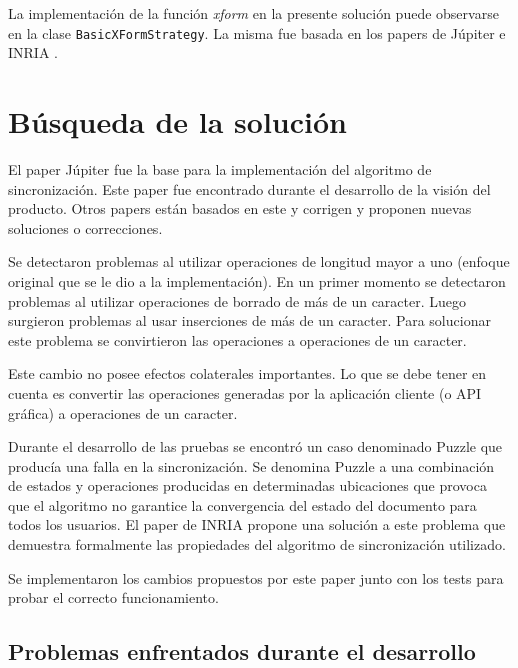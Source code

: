 \documentclass[12pt,a4paper]{article}
\begin{document}
La implementación de la función \textit{xform} en la presente solución puede observarse en la clase 
\texttt{BasicXFormStrategy}. La misma fue basada en los papers de Júpiter e INRIA \cite{inria}.

	\section{Búsqueda de la solución}

El paper Júpiter\cite{jupiter} fue la base para la implementación del algoritmo de sincronización. Este paper fue 
encontrado durante el desarrollo de la visión \cite{visiontpprof} del producto. Otros papers están basados en este y
corrigen y proponen nuevas soluciones o correcciones.

Se detectaron problemas al utilizar operaciones de longitud mayor a uno (enfoque original que se le
dio a la implementación). En un primer momento se detectaron problemas al utilizar operaciones de borrado
de más de un caracter. Luego surgieron problemas al usar inserciones de más de un caracter. Para solucionar
este problema se convirtieron las operaciones a operaciones de un caracter.

Este cambio no posee efectos colaterales importantes. Lo que se debe tener en cuenta es convertir las
operaciones generadas por la aplicación cliente (o API gráfica) a operaciones de un caracter.

Durante el desarrollo de las pruebas se encontró un caso denominado Puzzle\cite{inria} que producía una falla en la
sincronización. Se denomina Puzzle a una combinación de estados y operaciones producidas en determinadas
ubicaciones que provoca que el algoritmo no garantice la convergencia del estado del documento para todos 
los usuarios. El paper de INRIA\cite{inria} propone una solución a este problema que demuestra formalmente las 
propiedades del algoritmo de sincronización utilizado.

Se implementaron los cambios propuestos por este paper junto con los tests para probar el correcto funcionamiento.


\subsection{Problemas enfrentados durante el desarrollo}
\end{document}
